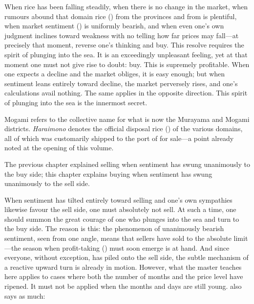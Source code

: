 


\begin{sokyubox}
{\small\itshape\color{sokyubar} }

\medskip
When rice has been falling steadily, when there is no change in the
 market, when rumours abound that domain rice
() from the provinces and from 
is plentiful, when market sentiment () is uniformly
bearish, and when even one's own judgment inclines toward weakness with
no telling how far prices may fall---at precisely that moment, reverse
one's thinking and buy. This resolve requires the spirit of plunging
into the sea. It is an exceedingly unpleasant feeling, yet at that
moment one must not give rise to doubt: buy. This is supremely
profitable. When one expects a decline and the market obliges, it is
easy enough; but when sentiment leans entirely toward decline, the
market perversely rises, and one's calculations avail nothing. The same
applies in the opposite direction. This spirit of plunging into the sea
is the innermost secret.
\end{sokyubox}

\commentary
Mogami refers to the collective name for what is now the Murayama and
Mogami districts. \textit{Haraimono} denotes the official disposal rice
() of the various domains, all of which was
customarily shipped to the port of  for sale---a point
already noted at the opening of this volume.

The previous chapter explained selling when sentiment has swung
unanimously to the buy side; this chapter explains buying when sentiment
has swung unanimously to the sell side.

When sentiment has tilted entirely toward selling and one's own
sympathies likewise favour the sell side, one must absolutely not sell.
At such a time, one should summon the great courage of one who plunges
into the sea and turn to the buy side. The reason is this: the
phenomenon of unanimously bearish sentiment, seen from one angle, means
that sellers have sold to the absolute limit---the season when
profit-taking () must soon emerge is at hand. And since
everyone, without exception, has piled onto the sell side, the subtle
mechanism of a reactive upward turn is already in motion. However, what
the master teaches here applies to cases where both the number of months
and the price level have ripened. It must not be applied when the months
and days are still young.  also says as much:

